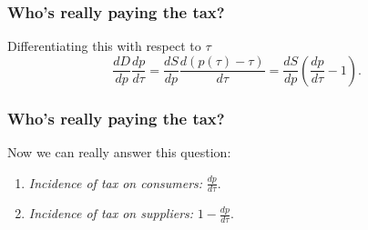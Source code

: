 \documentclass[xcolor=pdftex,dvipsnames]{beamer}
\begin{document}
\begin{frame}
\frametitle{Who's really paying the tax?}
Differentiating this with respect to $\tau$
\[
\frac{dD}{dp}\frac{dp}{d\tau} =
\frac{dS}{dp}\frac{d(p(\tau)-\tau)}{d\tau} = \frac{dS}{dp}\left(\frac{dp}{d\tau}-1\right).
\]

\bigskip{}

\end{frame}

\begin{frame}
\frametitle{Who's really paying the tax?}
Now we can really answer this question:

\begin{enumerate}
\item \emph{Incidence of tax on consumers:} $\frac{dp}{d\tau}$.
\item \emph{Incidence of tax on suppliers:} $1-\frac{dp}{d\tau}$.
\end{enumerate}
\end{frame}
\end{document}
